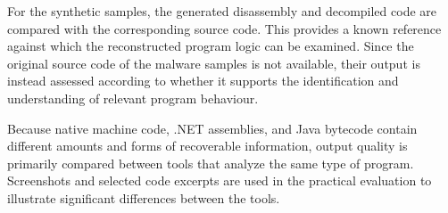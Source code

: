For the synthetic samples, the generated disassembly and decompiled code are compared with the corresponding source code. This provides a known reference against which the reconstructed 
program logic can be examined. Since the original source code of the malware samples is not available, their output is instead assessed according to whether it supports the 
identification and understanding of relevant program behaviour.

Because native machine code, .NET assemblies, and Java bytecode contain different amounts and forms of recoverable information, output quality is primarily compared between tools that 
analyze the same type of program. Screenshots and selected code excerpts are used in the practical evaluation to illustrate significant differences between the tools.


